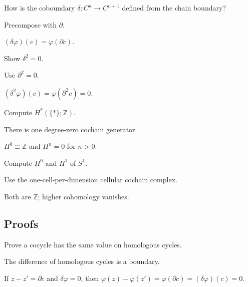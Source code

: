 \begin{exercise}[Coboundary]\label{exr:viii28-ped-02}
How is the coboundary $\delta:C^n\to C^{n+1}$ defined from the chain boundary?
\end{exercise}
\begin{hint}
Precompose with $\partial$.
\end{hint}
\begin{solution}
$(\delta\varphi)(c)=\varphi(\partial c)$.
\end{solution}

\begin{exercise}\label{exr:viii28-ped-03}
Show $\delta^2=0$.
\end{exercise}
\begin{hint}
Use $\partial^2=0$.
\end{hint}
\begin{solution}
$(\delta^2\varphi)(c)=\varphi(\partial^2c)=0$.
\end{solution}

\begin{exercise}\label{exr:viii28-ped-04}
Compute $H^*(\{*\};\mathbb Z)$.
\end{exercise}
\begin{hint}
There is one degree-zero cochain generator.
\end{hint}
\begin{solution}
$H^0\cong\mathbb Z$ and $H^n=0$ for $n>0$.
\end{solution}

\begin{exercise}\label{exr:viii28-ped-05}
Compute $H^0$ and $H^1$ of $S^1$.
\end{exercise}
\begin{hint}
Use the one-cell-per-dimension cellular cochain complex.
\end{hint}
\begin{solution}
Both are $\mathbb Z$; higher cohomology vanishes.
\end{solution}

\subsection*{Proofs}

\begin{exercise}\label{exr:viii28-ped-06}
Prove a cocycle has the same value on homologous cycles.
\end{exercise}
\begin{hint}
The difference of homologous cycles is a boundary.
\end{hint}
\begin{solution}
If $z-z'=\partial c$ and $\delta\varphi=0$, then $\varphi(z)-\varphi(z')=\varphi(\partial c)=(\delta\varphi)(c)=0$.
\end{solution}

